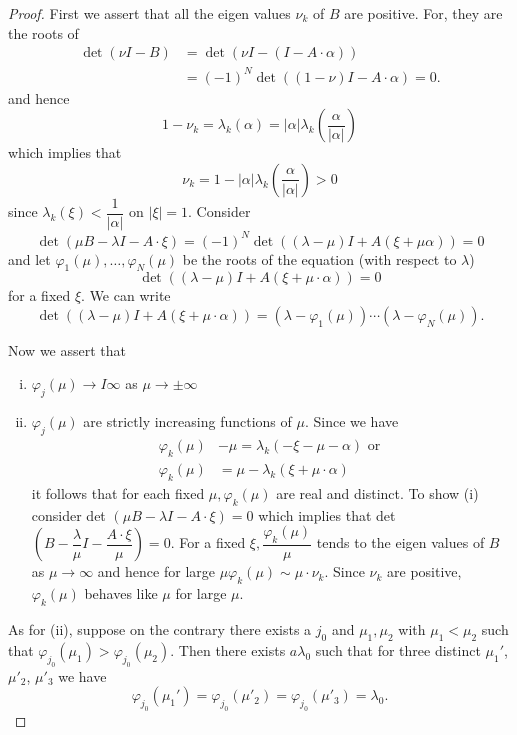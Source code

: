 \begin{proof}%
First we assert that all the eigen values $\nu_k$ of $B$ are
positive. For, they are the roots of  
\begin{align*}
\det (\nu I - B) & = \det (\nu I-(I-A \cdot \alpha ))\\
& = (-1)^N \det ((1- \nu ) I-A \cdot  \alpha ) = 0.
\end{align*}
and hence
$$
1-\nu_k = \lambda_k (\alpha) = |\alpha| \lambda_k
(\frac{\alpha}{|\alpha|}) 
$$
which implies that
\begin{equation}
\nu_k = 1- |\alpha | \lambda_k (\frac{\alpha}{|\alpha|}) > 0
\tag{7.5}\label{chap3-eq7.5}   
\end{equation}
since $\lambda_k (\xi) < \dfrac{1}{|\alpha|}$ on $|\xi| = 1$. Consider  
$$
\det (\mu B-\lambda I- A \cdot \xi) = (-1)^N \det 
((\lambda- \mu) I + A(\xi + \mu \alpha)) = 0  
$$
and let $\varphi_1 (\mu), \ldots, \varphi_N (\mu)$ be the roots of
the equation (with respect to $\lambda$) 
$$
\det ((\lambda -\mu)I + A(\xi+ \mu\cdot \alpha)) = 0 
$$
for a fixed $\xi$. We can write
$$
\det ((\lambda- \mu) I + A(\xi+ \mu \cdot \alpha)) = (\lambda-
\varphi_1 (\mu))\cdots(\lambda-\varphi_N(\mu)). 
$$

Now we assert that
\begin{enumerate}[(i)]
\item  $\varphi_j (\mu)\rightarrow I \infty$ as $\mu \rightarrow \pm
  \infty$

\item $\varphi_j (\mu)$ are strictly increasing functions of $\mu$. Since
  we have
\begin{align*}
\varphi_k (\mu)& -\mu= \lambda_k (-\xi-\mu- \alpha) \text{ or }\\
\varphi_k (\mu ) & = \mu - \lambda_k (\xi + \mu \cdot \alpha )
\tag{7.6}\label{chap3-eq7.6} 
\end{align*}\pageoriginale
it follows that for each fixed $\mu, \varphi_k(\mu)$ are real and
distinct. To show (i) consider det $(\mu B-\lambda I-A \cdot \xi ) = 0$
which implies that det $(B- \dfrac{\lambda}{\mu}I - \dfrac{ A \cdot \xi}{
  \mu})=0$. For a fixed $\xi, \dfrac{\varphi_k (\mu)}{\mu}$ tends
to the eigen values of $B$ as $\mu \rightarrow \infty$ and hence for
large $\mu \varphi_k (\mu)\sim \mu \cdot \nu_k$. Since $\nu_k$ are
positive, $\varphi_k(\mu)$ behaves like $\mu$ for large $\mu$. 
\end{enumerate}

As for (ii), suppose on the contrary there exists a $j_0$ and
$\mu_1, \mu_2$ with $\mu_1 < \mu_2$ such that
$\varphi_{j_{0}}(\mu_1) > \varphi_{j_{0}}(\mu_2)$. Then there exists
$a \lambda_{0}$ such that for three distinct $\mu_1'$, $\mu'_2$,
$\mu'_3$ we have 
$$
\varphi_{j_{0}}(\mu_1') = \varphi_{j_{0}}(\mu'_2)= 
\varphi_{j_{0}}(\mu'_3)=\lambda_0. 
$$


\end{proof}
